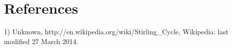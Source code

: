 \documentclass{article}
\begin{document}
\subsection{}
\ 
\\\\\\\\\\\\\\\\\\\\\\\\\\\\\\\\\\\\\\\\\\\\\\\\\\\\\\\\\\\\\\\\\\\\\\\\\\\\
\section{References}
1) Unknown, http://en.wikipedia.org/wiki/Stirling\_Cycle, Wikipedia: last modified 27 March 2014.
\end{document}
